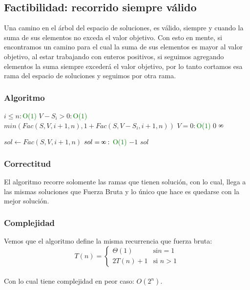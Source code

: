 \subsection{Factibilidad: recorrido siempre v\'alido}
Una camino en el \'arbol del espacio de soluciones, es v\'alido, siempre y cuando la suma de sus elementos no exceda el valor objetivo.
Con esto en mente, si encontramos un camino para el cual la suma de sus elementos es mayor al valor objetivo, al estar trabajando con enteros positivos, si seguimos agregando elementos la suma siempre exceder\'a el valor objetivo, por lo tanto cortamos esa rama del espacio de soluciones y seguimos por otra rama.\\

\subsubsection{Algoritmo}
\begin{codebox}
    \li \If $i \leq n:$\quad\quad\textcolor{green}{O($1$)}
        \Then
    \li     \If $V-S_{i} > 0:$\quad\quad\textcolor{green}{O($1$)}
                \Then
    \li              \Return $min(Fac(S,V,i+1,n),1 +Fac(S, V-S_{i}, i+1, n))$
                \End         
    \li     \If $V = 0 :$\quad\quad\textcolor{green}{O($1$)}
                \Then
    \li             \Return $0$
                \End
            \End
    \li \Return $\infinity$ 

    \end{codebox}

\begin{codebox}
    \li $sol \leftarrow Fac(S,V,i+1,n)$
    \li \If $sol = \infinity:$ \quad\quad\textcolor{green}{O($1$)}
        \Then
    \li   
            \Return $-1$
        \End
    \li     \Return $sol$

    \end{codebox}        
\subsubsection{Correctitud}
El algoritmo recorre solomente las ramas que tienen soluci\'on, con lo cual, llega a las mismas soluciones que Fuerza Bruta y lo \'unico que hace es quedarse con la mejor soluci\'on.
\subsubsection{Complejidad}
Vemos que el algoritmo define la misma recurrencia que fuerza bruta:\\
$$
T(n) = \left\{
\begin{array}{cl}
 \Theta (1) &\mbox{si
} n = 1 \\
2T(n)+1&\mbox{si } n > 1
\end{array}\right.
$$
\\
Con lo cual tiene complejidad en peor caso: $O(2^{n})$.\\
